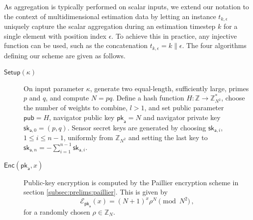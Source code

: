 As aggregation is typically performed on scalar inputs, we extend our notation to the context of multidimensional estimation data by letting an instance $t_{k,\epsilon}$ uniquely capture the scalar aggregation during an estimation timestep $k$ for a single element with position index $\epsilon$. To achieve this in practice, any injective function can be used, such as the concatenation $t_{k,\epsilon}=k\mathbin\|\epsilon$. The four algorithms defining our scheme are given as follows.
\begin{description}
    \item[$\mathsf{Setup}(\kappa)$] On input parameter $\kappa$, generate two equal-length, sufficiently large, primes $p$ and $q$, and compute $N=pq$. Define a hash function $H:\mathbb{Z} \rightarrow \mathbb{Z}_{N^2}^*$, choose the number of weights to combine, $l>1$, and set public parameter $\mathsf{pub}=H$, navigator public key $\mathsf{pk}_{\mathsf{a}} = N$ and navigator private key $\mathsf{sk}_{\mathsf{a},0}=(p,q)$. Sensor secret keys are generated by choosing $\mathsf{sk}_{\mathsf{a},i}$, $1\leq i\leq n-1$, uniformly from $\mathbb{Z}_{N^2}$ and setting the last key to $\mathsf{sk}_{\mathsf{a},n} = -\sum^{n-1}_{i=1}\mathsf{sk}_{\mathsf{a},i}$.
 
    \item[$\mathsf{Enc}(\mathsf{pk}_{\mathsf{a}}, x)$] Public-key encryption is computed by the Paillier encryption scheme in section \ref{subsec:prelims:paillier}. This is given by
    \begin{equation}\label{eq:nonlin_fusion:lca_scheme_encryption}
        \mathcal{E}_{\mathsf{pk}_{\mathsf{a}}}(x) = (N+1)^{x}\rho^N \pmod{N^2}\,,
    \end{equation}
    for a randomly chosen $\rho \in \mathbb{Z}_N$.


\end{description}
